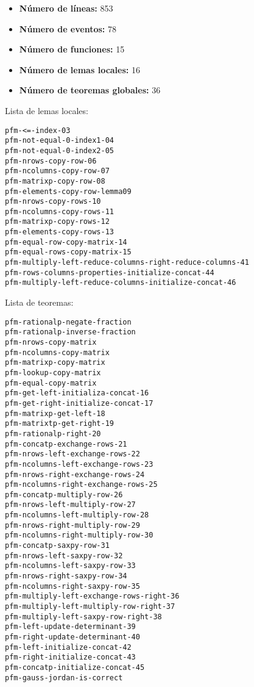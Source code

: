 \documentclass[a4paper,10pt]{article}
\begin{document}
\begin{itemize}
	\item \textbf{Número de líneas:} 853
	\item \textbf{Número de eventos:} 78
	\item \textbf{Número de funciones:} 15
	\item \textbf{Número de lemas locales:} 16 
	\item \textbf{Número de teoremas globales:} 36
\end{itemize}

\par \vspace{10pt}

Lista de lemas locales:

\par \vspace{10pt}

\begin{lstlisting}[language=clips]
pfm-<=-index-03
pfm-not-equal-0-index1-04
pfm-not-equal-0-index2-05
pfm-nrows-copy-row-06
pfm-ncolumns-copy-row-07
pfm-matrixp-copy-row-08
pfm-elements-copy-row-lemma09
pfm-nrows-copy-rows-10
pfm-ncolumns-copy-rows-11
pfm-matrixp-copy-rows-12
pfm-elements-copy-rows-13
pfm-equal-row-copy-matrix-14
pfm-equal-rows-copy-matrix-15
pfm-multiply-left-reduce-columns-right-reduce-columns-41
pfm-rows-columns-properties-initialize-concat-44
pfm-multiply-left-reduce-columns-initialize-concat-46
\end{lstlisting}

\par \vspace{10pt}

Lista de teoremas:

\par \vspace{10pt}

\begin{lstlisting}[language=clips]
pfm-rationalp-negate-fraction
pfm-rationalp-inverse-fraction
pfm-nrows-copy-matrix
pfm-ncolumns-copy-matrix
pfm-matrixp-copy-matrix
pfm-lookup-copy-matrix
pfm-equal-copy-matrix
pfm-get-left-initializa-concat-16
pfm-get-right-initialize-concat-17
pfm-matrixp-get-left-18
pfm-matrixtp-get-right-19
pfm-rationalp-right-20
pfm-concatp-exchange-rows-21
pfm-nrows-left-exchange-rows-22
pfm-ncolumns-left-exchange-rows-23
pfm-nrows-right-exchange-rows-24
pfm-ncolumns-right-exchange-rows-25
pfm-concatp-multiply-row-26
pfm-nrows-left-multiply-row-27
pfm-ncolumns-left-multiply-row-28
pfm-nrows-right-multiply-row-29
pfm-ncolumns-right-multiply-row-30
pfm-concatp-saxpy-row-31
pfm-nrows-left-saxpy-row-32
pfm-ncolumns-left-saxpy-row-33
pfm-nrows-right-saxpy-row-34
pfm-ncolumns-right-saxpy-row-35
pfm-multiply-left-exchange-rows-right-36
pfm-multiply-left-multiply-row-right-37
pfm-multiply-left-saxpy-row-right-38
pfm-left-update-determinant-39
pfm-right-update-determinant-40
pfm-left-initialize-concat-42
pfm-right-initialize-concat-43
pfm-concatp-initialize-concat-45
pfm-gauss-jordan-is-correct 
\end{lstlisting}
\end{document}

